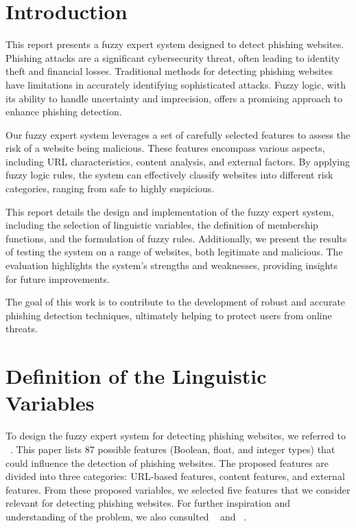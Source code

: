 \documentclass[11pt]{article}
\begin{document}
\tableofcontents
\newpage

\section{Introduction}
This report presents a fuzzy expert system designed to detect phishing websites. Phishing attacks are a significant cybersecurity threat, often leading to identity theft and financial losses. Traditional methods for detecting phishing websites have limitations in accurately identifying sophisticated attacks. Fuzzy logic, with its ability to handle uncertainty and imprecision, offers a promising approach to enhance phishing detection.

Our fuzzy expert system leverages a set of carefully selected features to assess the risk of a website being malicious. These features encompass various aspects, including URL characteristics, content analysis, and external factors. By applying fuzzy logic rules, the system can effectively classify websites into different risk categories, ranging from safe to highly suspicious.

This report details the design and implementation of the fuzzy expert system, including the selection of linguistic variables, the definition of membership functions, and the formulation of fuzzy rules. Additionally, we present the results of testing the system on a range of websites, both legitimate and malicious. The evaluation highlights the system's strengths and weaknesses, providing insights for future improvements.

The goal of this work is to contribute to the development of robust and accurate phishing detection techniques, ultimately helping to protect users from online threats.

\section{Definition of the Linguistic Variables}
To design the fuzzy expert system for detecting phishing websites, we referred to ~\cite{mainpaper}. This paper lists 87 possible features (Boolean, float, and integer types) that could influence the detection of phishing websites. The proposed features are divided into three categories: URL-based features, content features, and external features. From these proposed variables, we selected five features that we consider relevant for detecting phishing websites. For further inspiration and understanding of the problem, we also consulted ~\cite{introduction1} and ~\cite{introduction2}.
\end{document}
